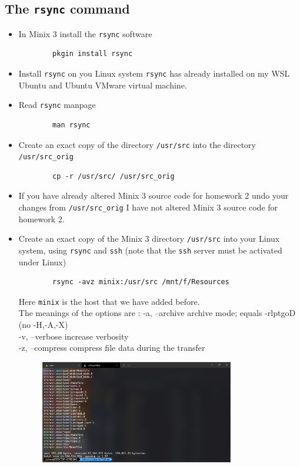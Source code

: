 \documentclass[a4paper]{article}
\begin{document}
\subsection{The \texttt{rsync} command}
\begin{itemize}
    \item In Minix 3 install the \texttt{rsync} software
    \begin{verbatim}
        pkgin install rsync
    \end{verbatim}
    \item Install \texttt{rsync} on you Linux system
    \texttt{rsync} has already installed on my WSL Ubuntu and Ubuntu VMware virtual machine.
    \item Read \texttt{rsync} manpage
    \begin{verbatim}
        man rsync
    \end{verbatim}
    \item Create an exact copy of the directory \texttt{/usr/src} into the directory \texttt{/usr/src\_orig}
    \begin{verbatim}
        cp -r /usr/src/ /usr/src_orig
    \end{verbatim}
    \item If you have already altered Minix 3 source code for homework 2 undo your changes from \texttt{/usr/src\_orig}
    I have not altered Minix 3 source code for homework 2.
    \item Create an exact copy of the Minix 3 directory \texttt{/usr/src} into your Linux system, using \texttt{rsync} and \texttt{ssh} (note that the \texttt{ssh} server must be activated under Linux)
    \begin{verbatim}
        rsync -avz minix:/usr/src /mnt/f/Resources
    \end{verbatim}
    Here \texttt{minix} is the host that we have added before.\\
    The meanings of the options are \cite{rsync}:
    -a, --archive               archive mode; equals -rlptgoD (no -H,-A,-X)\\
    -v, --verbose               increase verbosity\\
    -z, --compress              compress file data during the transfer
    \begin{figure}[H]
        \centering
        \includegraphics[width=0.8\textwidth]{1.png}

\end{figure}
\end{itemize}
\end{document}
